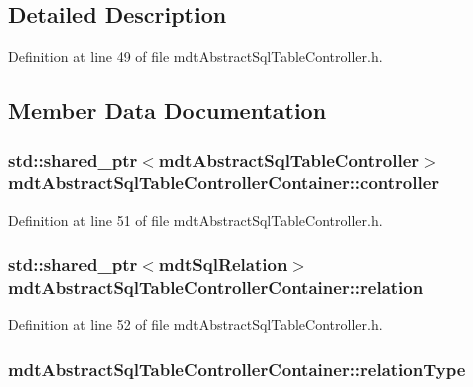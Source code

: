 \subsection{Detailed Description}


Definition at line 49 of file mdt\-Abstract\-Sql\-Table\-Controller.\-h.



\subsection{Member Data Documentation}
\hypertarget{structmdt_abstract_sql_table_controller_container_a78aed5460ebf7f78d18ac80bb855fa39}{
\subsubsection[{controller}]{\setlength{\rightskip}{0pt plus 5cm}std\-::shared\-\_\-ptr$<${\bf mdt\-Abstract\-Sql\-Table\-Controller}$>$ mdt\-Abstract\-Sql\-Table\-Controller\-Container\-::controller}}\label{structmdt_abstract_sql_table_controller_container_a78aed5460ebf7f78d18ac80bb855fa39}


Definition at line 51 of file mdt\-Abstract\-Sql\-Table\-Controller.\-h.

\hypertarget{structmdt_abstract_sql_table_controller_container_ac628635f902685e4c5c15f7cc2327af9}{
\subsubsection[{relation}]{\setlength{\rightskip}{0pt plus 5cm}std\-::shared\-\_\-ptr$<${\bf mdt\-Sql\-Relation}$>$ mdt\-Abstract\-Sql\-Table\-Controller\-Container\-::relation}}\label{structmdt_abstract_sql_table_controller_container_ac628635f902685e4c5c15f7cc2327af9}


Definition at line 52 of file mdt\-Abstract\-Sql\-Table\-Controller.\-h.

\hypertarget{structmdt_abstract_sql_table_controller_container_a95e403f88110d0b5f94b39be887226db}{
\subsubsection[{relation\-Type}]{ mdt\-Abstract\-Sql\-Table\-Controller\-Container\-::relation\-Type}}\label{structmdt_abstract_sql_table_controller_container_a95e403f88110d0b5f94b39be887226db}



